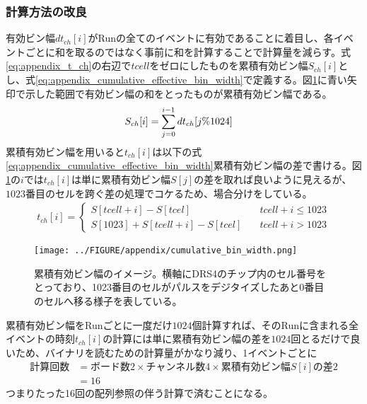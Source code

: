 \documentclass[../../main.tex]{subfiles}
\numberwithin{equation}{section}
\numberwithin{table}{section}
\numberwithin{figure}{section}
\begin{document}
    \subsubsection{計算方法の改良}
      有効ビン幅$dt_{ch}[i]$がRunの全てのイベントに有効であることに着目し、各イベントごとに和を取るのではなく事前に和を計算することで計算量を減らす。式\eqref{eq:appendix_t_ch}の右辺で$tcell$をゼロにしたものを累積有効ビン幅$S_{ch}[i]$とし、式\eqref{eq:appendix_cumulative_effective_bin_width}で定義する。図\ref{fig:appendix_cumulative_bin_width}に青い矢印で示した範囲で有効ビン幅の和をとったものが累積有効ビン幅である。
      \begin{align}
        S_{ch}[i]&=\sum_{j=0}^{i-1}dt_{ch}\qty[j\%1024]\label{eq:appendix_cumulative_effective_bin_width}
      \end{align}
      累積有効ビン幅を用いると$t_{ch}[i]$は以下の式\eqref{eq:appendix_cumulative_effective_bin_width}累積有効ビン幅の差で書ける。図\ref{fig:appendix_cumulative_bin_width}の$i$では$t_{ch}[i]$は単に累積有効ビン幅$S[j]$の差を取れば良いように見えるが、$1023$番目のセルを跨ぐ差の処理でコケるため、場合分けをしている。
      \begin{align}
        t_{ch}[i]=\begin{cases}
          S[tcell+i]-S[tcel] & \quad tcell+i\leq1023\\
          S[1023]+S[tcell+i]-S[tcel] & \quad tcell+i>1023
        \end{cases}\label{eq:appendix_cumulative_effective_bin_width}
      \end{align}

      \begin{figure}[tbp]
        \centering
        \texttt{[image: ../FIGURE/appendix/cumulative\_bin\_width.png]}
        \caption{累積有効ビン幅のイメージ。横軸にDRS4のチップ内のセル番号をとっており、1023番目のセルがパルスをデジタイズしたあと0番目のセルへ移る様子を表している。}
        \label{fig:appendix_cumulative_bin_width}
      \end{figure}

      累積有効ビン幅をRunごとに一度だけ$1024$個計算すれば、そのRunに含まれる全イベントの時刻$t_{ch}[i]$の計算には単に累積有効ビン幅の差を$1024$回とるだけで良いため、バイナリを読むための計算量がかなり減り、1イベントごとに
      \begin{align}
        \text{計算回数}&=\text{ボード数2}\times\text{チャンネル数4}\times\text{累積有効ビン幅$S[i]$の差2}\\
        &=16
      \end{align}
      つまりたった16回の配列参照の伴う計算で済むことになる。
\end{document}

